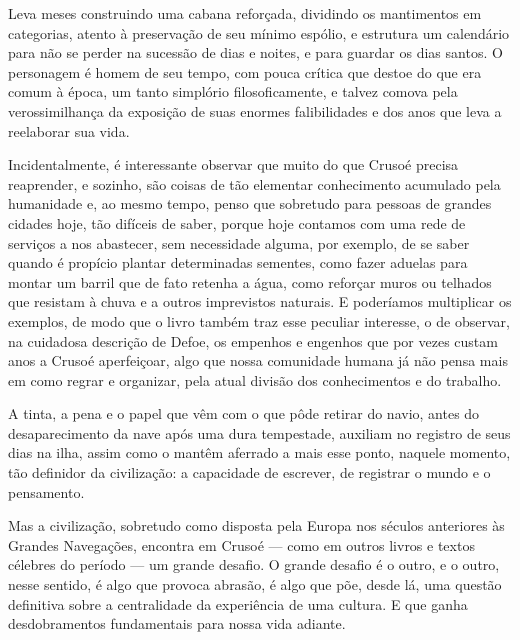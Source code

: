 Leva meses construindo uma cabana reforçada, dividindo os mantimentos em
categorias, atento à preservação de seu mínimo espólio, e estrutura um
calendário para não se perder na sucessão de dias e noites, e para
guardar os dias santos. O personagem é homem de seu tempo, com pouca
crítica que destoe do que era comum à época, um tanto simplório
filosoficamente, e talvez comova pela verossimilhança da exposição de
suas enormes falibilidades e dos anos que leva a reelaborar sua vida.

Incidentalmente, é interessante observar que muito do que Crusoé precisa
reaprender, e sozinho, são coisas de tão elementar conhecimento
acumulado pela humanidade e, ao mesmo tempo, penso que sobretudo para
pessoas de grandes cidades hoje, tão difíceis de saber, porque hoje
contamos com uma rede de serviços a nos abastecer, sem necessidade
alguma, por exemplo, de se saber quando é propício plantar determinadas
sementes, como fazer aduelas para montar um barril que de fato retenha a
água, como reforçar muros ou telhados que resistam à chuva e a outros
imprevistos naturais. E poderíamos multiplicar os exemplos, de modo que
o livro também traz esse peculiar interesse, o de observar, na cuidadosa
descrição de Defoe, os empenhos e engenhos que por vezes custam anos a
Crusoé aperfeiçoar, algo que nossa comunidade humana já não pensa mais
em como regrar e organizar, pela atual divisão dos conhecimentos e do
trabalho.

A tinta, a pena e o papel que vêm com o que pôde retirar do navio, antes
do desaparecimento da nave após uma dura tempestade, auxiliam no
registro de seus dias na ilha, assim como o mantêm aferrado a mais esse
ponto, naquele momento, tão definidor da civilização: a capacidade de
escrever, de registrar o mundo e o pensamento.

Mas a civilização, sobretudo como disposta pela Europa nos séculos
anteriores às Grandes Navegações, encontra em Crusoé --- como em outros
livros e textos célebres do período --- um grande desafio. O grande
desafio é o outro, e o outro, nesse sentido, é algo que provoca abrasão,
é algo que põe, desde lá, uma questão definitiva sobre a centralidade da
experiência de uma cultura. E que ganha desdobramentos fundamentais para
nossa vida adiante.


